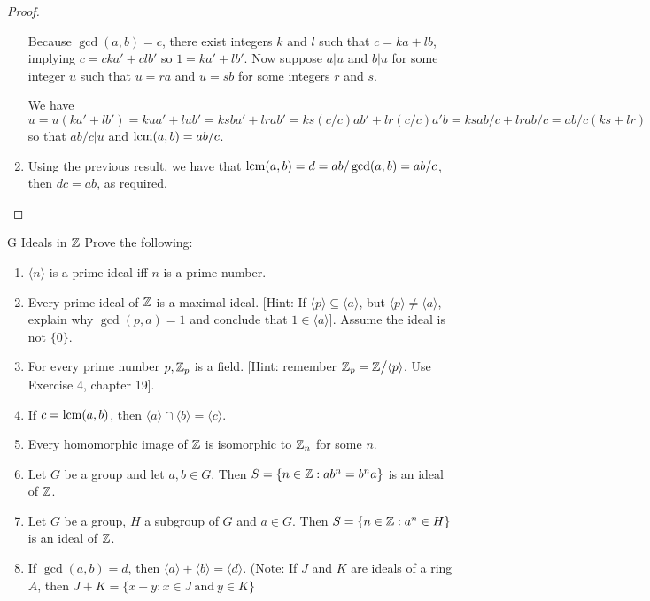 \begin{proof}
\begin{enumerate}
    Because $\gcd(a,b)=c$, there exist integers $k$ and $l$ such that $c=ka+lb$, implying $c=cka'+clb'$ so $1=ka'+lb'$. Now suppose $a\vert u$ and $b\vert u$ for some integer $u$ such that $u=ra$ and $u=sb$ for some integers $r$ and $s$. 
    
    We have $u =u(ka'+lb')= kua'+lub'= ksba'+lrab'= ks(c/c)ab'+lr(c/c)a'b= ksab/c+lrab/c= ab/c(ks+lr)$ so that $ab/c\vert u$ and $\operatorname*{lcm}(a,b)=ab/c$.
    \item Using the previous result, we have that $\operatorname*{lcm}(a,b)=d=ab/\gcd(a,b)=ab/c$, then $dc=ab$, as required.
\end{enumerate}
\end{proof}

\begin{exercise}{G Ideals in $\mathbb{Z}$}
Prove the following:
\begin{enumerate}
    \item $\langle n\rangle$ is a prime ideal iff $n$ is a prime number.
    \item Every prime ideal of $\mathbb{Z}$ is a maximal ideal. [Hint: If $\langle p\rangle\subseteq\langle a\rangle$, but $\langle p\rangle\neq\langle a\rangle$, explain why $\gcd(p,a)=1$ and conclude that $1\in\langle a\rangle$]. Assume the ideal is not $\{0\}$.
    \item For every prime number $p, \mathbb{Z}_{p}$ is a field. [Hint: remember $\mathbb{Z}_{p}={\textstyle \mathbb{Z}}\big/{\textstyle \langle p\rangle}$. Use Exercise 4, chapter 19].
    \item If $c=\operatorname*{lcm}(a,b)$, then $\langle a\rangle\cap\langle b\rangle=\langle c\rangle$.
    \item Every homomorphic image of $\mathbb{Z}$ is isomorphic to $\mathbb{Z}_{n}$ for some $n$.
    \item Let $G$ be a group and let $a,b\in G$. Then $S=\{n\in \mathbb{Z}:ab^{n}=b^{n}a\}$ is an ideal of $\mathbb{Z}$.
    \item Let $G$ be a group, $H$ a subgroup of $G$ and $a\in G$. Then $S=\{n\in\mathbb{Z}:a^{n}\in H\}$ is an ideal of $\mathbb{Z}$.
    \item If $\gcd(a,b)=d$, then $\langle a\rangle+\langle b\rangle =\langle d\rangle$. (Note: If $J$ and $K$ are ideals of a ring $A$, then $J+K=\{x+y:x\in J\ \text{and}\ y\in K\}$
\end{enumerate}
\end{exercise}
